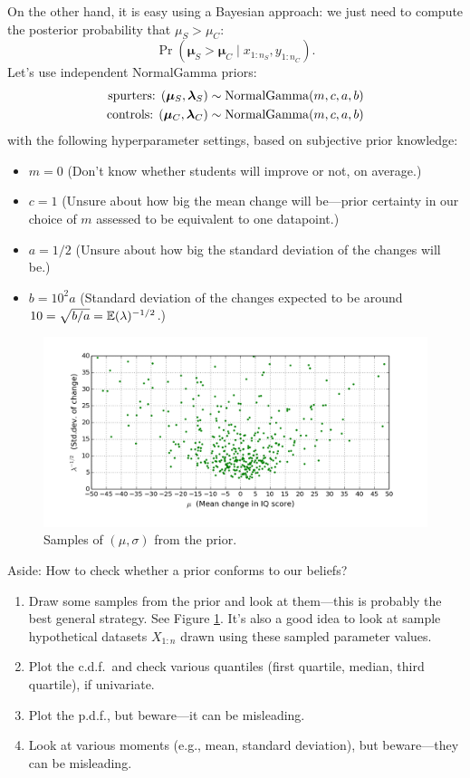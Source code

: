 \documentclass[12pt]{article}
\begin{document}
On the other hand, it is easy using a Bayesian approach: we just need to compute the posterior probability that $\mu_S>\mu_C$:
$$ \Pr(\bm\mu_S > \bm\mu_C \mid x_{1:n_S},y_{1:n_C}). $$
Let's use independent NormalGamma priors:
\begin{align*}
\text{spurters: } (\bm\mu_S,\bm\lambda_S) \sim \operatorname*{NormalGamma}(m,c,a,b)\\
\text{controls: } (\bm\mu_C,\bm\lambda_C) \sim \operatorname*{NormalGamma}(m,c,a,b)
\end{align*}
with the following hyperparameter settings, based on subjective prior knowledge:
\begin{itemize}
\item $m = 0$ (Don't know whether students will improve or not, on average.)
\item $c = 1$ (Unsure about how big the mean change will be---prior certainty in our choice of $m$ assessed to be equivalent to one datapoint.)
\item $a = 1/2$ (Unsure about how big the standard deviation of the changes will be.)
\item $b = 10^2 a$ (Standard deviation of the changes expected to be around $10 = \sqrt{b/a} = \mathbb{E}(\lambda)^{-1/2}$.)
\end{itemize}
\begin{figure}
  \begin{center}
    \includegraphics[width=1\textwidth]{pygmalion-prior.png}
  \end{center}
  \caption{Samples of $(\mu,\sigma)$ from the prior.}
  \label{figure:pygmalion-prior}
\end{figure}
Aside: How to check whether a prior conforms to our beliefs?
\begin{enumerate}
\item Draw some samples from the prior and look at them---this is probably the best general strategy. See Figure \ref{figure:pygmalion-prior}. It's also a good idea to look at sample hypothetical datasets $X_{1:n}$ drawn using these sampled parameter values. 
\item Plot the c.d.f.\ and check various quantiles (first quartile, median, third quartile), if univariate.
\item Plot the p.d.f., but beware---it can be misleading.
\item Look at various moments (e.g., mean, standard deviation), but beware---they can be misleading.
\end{enumerate}
\end{document}
